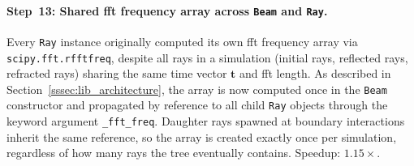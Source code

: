             \paragraph*{Step~13: Shared \acrshort{fft} frequency array across \texttt{Beam} and \texttt{Ray}.}
            Every \texttt{Ray} instance originally computed its own \acrshort{fft} frequency array via \texttt{scipy.fft.rfftfreq}, despite all rays in a simulation (initial rays, reflected rays, refracted rays) sharing the same time vector $\mathbf{t}$ and \acrshort{fft} length. As described in Section~\ref{sssec:lib_architecture}, the array is now computed once in the \texttt{Beam} constructor and propagated by reference to all child \texttt{Ray} objects through the keyword argument \texttt{\_fft\_freq}. Daughter rays spawned at boundary interactions inherit the same reference, so the array is created exactly once per simulation, regardless of how many rays the tree eventually contains.  Speedup: $1.15\times$.



